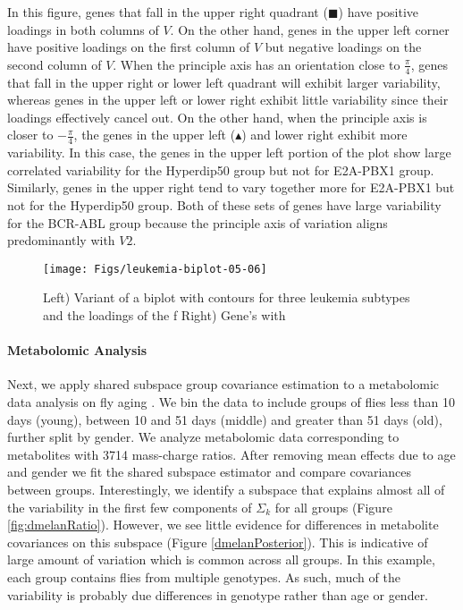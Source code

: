 \documentclass{article}
\begin{document}
In this figure, genes that fall in the upper right quadrant
($\blacksquare$) have positive loadings in both columns of $V$. On the
other hand, genes in the upper left corner have positive loadings on
the first column of $V$ but negative loadings on the second column of
$V$.  When the principle axis has an orientation close to
$\frac{\pi}{4}$, genes that fall in the upper right or lower left
quadrant will exhibit larger variability, whereas genes in the upper
left or lower right exhibit little variability since their loadings
effectively cancel out.  On the other hand, when the principle axis is
closer to $-\frac{\pi}{4}$, the genes in the upper left
($\blacktriangle$) and lower right exhibit more variability.  In this case,
the genes in the upper left portion of the plot show large correlated
variability for the Hyperdip50 group but not for E2A-PBX1 group.
Similarly, genes in the upper right tend to vary together more for
E2A-PBX1 but not for the Hyperdip50 group.  Both of these sets of
genes have large variability for the BCR-ABL group because the
principle axis of variation aligns predominantly with $V2$.  


  \begin{figure}[!ht]
    \centering
    \texttt{[image: Figs/leukemia-biplot-05-06]}
    \qquad
\raisebox{\height}{
\footnotesize

}
\caption{Left) Variant of a biplot with contours for three leukemia
  subtypes and the loadings of the f Right) Gene's with }
\label{fig:leukemiaBiplot}
  \end{figure}

\paragraph{Metabolomic Analysis}

Next, we apply shared subspace group covariance estimation to
a metabolomic data analysis on fly aging \citep{Hoffman2014}.  We bin the data to include
groups of flies less than 10 days (young), between 10 and 51 days (middle) and greater
than 51 days (old), further split by gender.   We analyze metabolomic
data corresponding to metabolites with 3714 mass-charge ratios.  After removing mean
effects due to age and gender we fit the shared subspace estimator and
compare covariances between groups.  Interestingly, we identify a
subspace that explains almost all of the variability in the first few
components of $\Sigma_k$ for all groups (Figure
\ref{fig:dmelanRatio}). However, we see little evidence for
differences in metabolite covariances on this subspace (Figure
\ref{dmelanPosterior}). This is indicative of large amount of
variation which is common across all groups. In this example, each
group contains flies from multiple genotypes.  As such, much of the
variability is probably due differences in genotype rather than age or
gender.  
\end{document}
